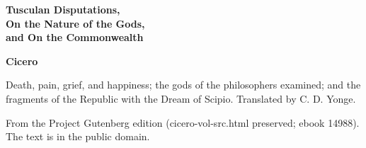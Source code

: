 \documentclass[11pt,letterpaper]{article}
\begin{document}
\color{ink}

\begin{titlepage}
\centering
\vspace*{4em}
{\LARGE\bfseries\color{heading} Tusculan Disputations,\\[0.3em]On the Nature of the Gods,\\[0.3em]and On the Commonwealth\par}
\vspace{2em}
{\Large\bfseries\color{heading} Cicero\par}
\vspace{2.5em}
{\itshape\color{subhead}\parbox{0.8\linewidth}{\centering Death, pain, grief, and happiness; the gods of the philosophers examined; and the fragments of the Republic with the Dream of Scipio. Translated by C. D. Yonge.\par}}
\vfill
{\small From the Project Gutenberg edition (cicero-vol-src.html preserved; ebook 14988). The text is in the public domain.\par}
\vspace{2em}
\end{titlepage}

\tableofcontents


\end{document}
